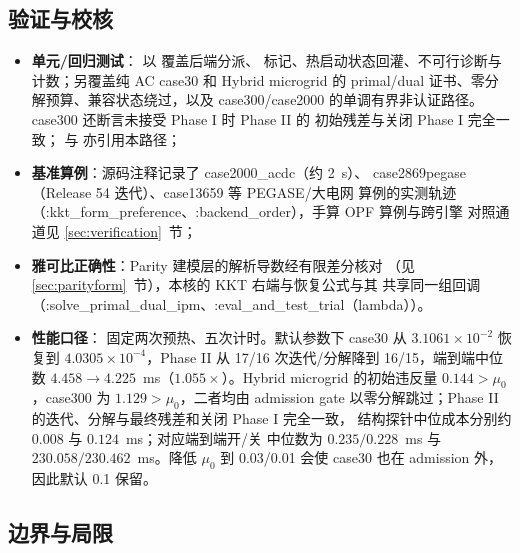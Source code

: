 \subsection{验证与校核}\label{subsec:pipm-verification}

\begin{itemize}
  \item \textbf{单元/回归测试}：
        以  覆盖后端分派、
         标记、热启动状态回灌、不可行诊断与
         计数；另覆盖纯 AC case30 和 Hybrid microgrid 的
        primal/dual 证书、零分解预算、兼容状态绕过，以及 case300/case2000
        的单调有界非认证路径。case300 还断言未接受 Phase I 时 Phase II 的
        初始残差与关闭 Phase I 完全一致；
         与
         亦引用本路径；
  \item \textbf{基准算例}：源码注释记录了 case2000\_acdc（约 2~s）、
        case2869pegase（Release 54 迭代）、case13659 等 PEGASE/大电网
        算例的实测轨迹（:kkt\_form\_preference、:backend\_order），手算 OPF 算例与跨引擎
        对照通道见 \ref{sec:verification}~节；
  \item \textbf{雅可比正确性}：Parity 建模层的解析导数经有限差分核对
        （见 \ref{sec:parityform}~节），本核的 KKT 右端与恢复公式与其
        共享同一组回调（:solve\_primal\_dual\_ipm、:eval\_and\_test\_trial（lambda））。
  \item \textbf{性能口径}：
        固定两次预热、五次计时。默认参数下 case30 从
        $3.1061\times10^{-2}$ 恢复到 $4.0305\times10^{-4}$，Phase II 从
        17/16 次迭代/分解降到 16/15，端到端中位数
        $4.458\to4.225$~ms（$1.055\times$）。Hybrid microgrid 的初始违反量
        $0.144>\mu_0$，case300 为 $1.129>\mu_0$，二者均由 admission gate
        以零分解跳过；Phase II 的迭代、分解与最终残差和关闭 Phase I 完全一致，
        结构探针中位成本分别约 $0.008$ 与 $0.124$~ms；对应端到端开/关
        中位数为 $0.235/0.228$~ms 与 $230.058/230.462$~ms。降低 $\mu_0$ 到
        0.03/0.01 会使 case30 也在 admission 外，因此默认 0.1 保留。
\end{itemize}

\subsection{边界与局限}\label{subsec:pipm-limits}

